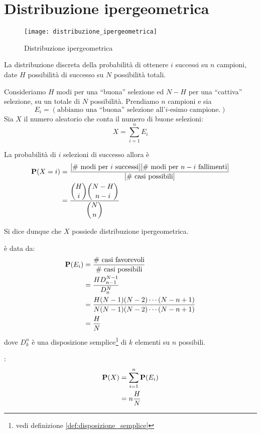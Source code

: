 \section{Distribuzione ipergeometrica} %
\begin{figure*}
  \texttt{[image: distribuzione\_ipergeometrica]}
  \caption{Distribuzione ipergeometrica} 
\end{figure*}

\begin{definition}
  \label{def:distribuzione_ipergeometrica}
  La distribuzione discreta della probabilità di ottenere \( i \) successi su \( n \) campioni, date \( H \) possibilità di successo su \( N \) possibilità totali.
\end{definition}
Consideriamo \( H \) modi per una ``buona'' selezione ed \( N - H \) per una ``cattiva'' selezione, su un totale di \( N \) possibilità.
Prendiamo \( n \) campioni e sia
\[ E_i = (\text{abbiamo una ``buona'' selezione all'}i\text{-esimo campione.}) \]
Sia \( X \) il numero aleatorio che conta il numero di buone selezioni:
\[
  X = \sum_{i = 1}^n E_i
\]

La probabilità di \( i \) selezioni di successo allora è
\begin{align*}
  \mathbf{P}(X = i) &= \frac{[\text{\# modi per }i\text{ successi}][\text{\# modi per }n - i\text{ fallimenti}]}{[\text{\# casi possibili}]} \\
  &= \frac{\displaystyle \binom{H}{i} \binom{N-H}{n-i}}{\displaystyle \binom{N}{n}}
\end{align*}

Si dice dunque che \( X \) possiede distribuzione ipergeometrica.

 è data da:
\begin{align*}
  \pr(E_i) &= \frac{\text{\# casi favorevoli}}{\text{\# casi possibili}} \\
  &= \frac{H D_{n-1}^{N-1}}{D_n^N} \\
  &= \frac{H (N-1)(N-2) \cdots (N-n+1)}{N(N-1)(N-2) \cdots (N-n+1)} \\ %
  &= \frac{H}{N}
\end{align*}
dove \( D_k^n \) è una disposizione semplice\footnote{vedi definizione \ref{def:disposizione_semplice}} di \( k \) elementi su \( n \) possibili.

:
\begin{align*}
  \mathbf{P}(X) &= \sum_{i=1}^n \mathbf{P}(E_i) \\
  &= n \frac{H}{N}
\end{align*}

